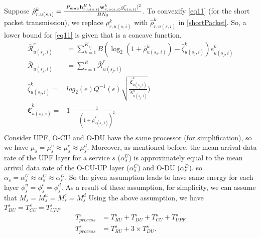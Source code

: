 \documentclass[conference]{IEEEtran}
\begin{document}
Suppose $\hat{\rho}_{r,u(s,i)}^{k} =  \frac{|P_{max}{\bold{h}_{r,u(s,i)}^{H \: k}} \bold{w}_{r,u(s,i)}^{k} g_{u(s,i)}^r|^2}{BN_0}$. 
To convexify \eqref{eq11} (for the short packet transmission), we replace ${\rho}_{r,u(s,i)}^{k}$ with $\hat{\rho}_{r,u(s,i)}^{k}$ in \eqref{shortPacket}. So, a lower bound for \eqref{eq11} is given that is a concave function.
\begin{equation}
\begin{split}
\bar{\mathcal{R}}_{u(s_j,i)}^{r} &= \sum_{k=1}^{K_{s_j}} B (\log_2({1+ \bar{\rho}_{u(s_2,i)}^{k}})- \hat{\zeta}_{u(s_j,i)}^{k}){e}_{u(s_j,i)}^{k}\\
\bar{\mathcal{R}}_{u(s_j,i)} &= \sum_{r=1}^{R}\bar{\mathcal{R}}_{u(s_j,i)}^{r}\\ 
 \hat{\zeta}_{u(s_j,i)}^{k} =& log_2({e})Q^{-1}(\epsilon) \sqrt{\frac{\hat{\mathfrak{C}}_{u(s_j,i)}^{k}}{N_{u(s_j,i)}^{k}}})\\
 \hat{\mathfrak{C}}_{u(s_j,i)}^{k} =& 1 - \frac{1}{(1+\hat{\rho}_{u(s_j,i)}^{k})^2}\\
\end{split}
\end{equation}
Consider UPF, O-CU and O-DU have the same processor (for simplification), so we have $\mu_s = \mu_s^u \approx \mu_s^c \approx \mu_s^d $. Moreover, as mentioned before,
the mean arrival data rate of the UPF layer for a service $s$ ($\alpha_{s}^U$) is approximately equal to the mean arrival data rate of the O-CU-UP layer ($\alpha_{s}^C$) and O-DU ($\alpha_{s}^D$). so $\alpha_{s} =\alpha_{s}^U \approx \alpha_{s}^C \approx \alpha_{s}^D$. 
So the given assumption leads to have same energy for each layer $\phi_s^u = \phi_s^c =\phi_s^d $.
As a result of these assumption, for simplicity, we can assume that $M_s = M_s^u = M_s^c = M_s^d $
Using the above assumption, we have $T_{DU}^{s} = T_{CU}^{s} = T_{UPF}^{s}$ 
\begin{equation}
\begin{split}
T_{process}^{s} &=  T_{RU}^{s} + T_{DU}^{s} + T_{CU}^{s} + T_{UPF}^{s} \\
T_{process}^{s} &=  T_{RU}^{s} + 3\times T_{DU}^{s}.
\end{split}
\end{equation}
\end{document}
